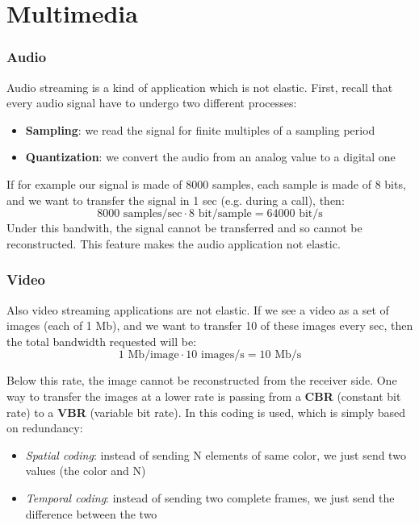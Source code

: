 \section{Multimedia}
\subsubsection{Audio}
Audio streaming is a kind of application which is not elastic. First, recall that every audio signal have to undergo two different processes:
\begin{itemize}
    \item \textbf{Sampling}: we read the signal for finite multiples of a sampling period
    \item \textbf{Quantization}: we convert the audio from an analog value to a digital one
\end{itemize}
\noindent If for example our signal is made of 8000 samples, each sample is made of 8 bits, and we want to transfer the signal in 1 sec (e.g. during a call), then:
\[8000 \text{ samples/sec}\cdot 8\text{ bit/sample}=64000\text{ bit/s}\]
\noindent Under this bandwith, the signal cannot be transferred and so cannot be reconstructed. This feature makes the audio application not elastic.

\subsubsection{Video}
Also video streaming applications are not elastic. If we see a video as a set of images (each of 1 Mb), and we want to transfer 10 of these images every sec, then the total bandwidth requested will be:
\[1 \text{ Mb/image}\cdot 10 \text{ images/s}=10 \text{ Mb/s}\]

\noindent Below this rate, the image cannot be reconstructed from the receiver side. One way to transfer the images at a lower rate is passing from a \textbf{CBR} (constant bit rate) to a \textbf{VBR} (variable bit rate). In this coding is used, which is simply based on redundancy:
\begin{itemize}
    \item \textit{Spatial coding}: instead of sending N elements of same color, we just send two values (the color and N)
    \item \textit{Temporal coding}: instead of sending two complete frames, we just send the difference between the two
\end{itemize}

